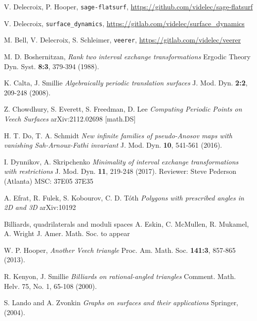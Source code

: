 \documentclass[a4paper,12pt]{article}
\begin{document}
\begin{thebibliography}{sage-flatsurf}

V. Delecroix, P. Hooper,
\texttt{sage-flatsurf},
\url{https://github.com/videlec/sage-flatsurf}

V. Delecroix,
\texttt{surface\_dynamics},
\url{https://gitlab.com/videlec/surface_dynamics}

M. Bell, V. Delecroix, S. Schleimer,
\texttt{veerer},
\url{https://gitlab.com/videlec/veerer}

M. D. Boshernitzan,
\textit{Rank two interval exchange transformations}
Ergodic Theory Dyn. Syst. \textbf{8:3}, 379-394 (1988).

K. Calta, J. Smillie
\textit{Algebraically periodic translation surfaces}
J. Mod. Dyn. \textbf{2:2}, 209-248 (2008).

Z. Chowdhury, S. Everett, S. Freedman, D. Lee
\textit{Computing Periodic Points on Veech Surfaces}
arXiv:2112.02698 [math.DS]

H. T. Do, T. A. Schmidt
\textit{New infinite families of pseudo-Anosov maps with vanishing Sah-Arnoux-Fathi invariant}
J. Mod. Dyn. \textbf{10}, 541-561 (2016).

I. Dynnikov, A. Skripchenko
\textit{Minimality of interval exchange transformations with restrictions}
J. Mod. Dyn. \textbf{11}, 219-248 (2017).
Reviewer: Steve Pederson (Atlanta)
MSC:  37E05 37E35

A. Efrat, R. Fulek, S. Kobourov, C. D. T\'oth
\textit{Polygons with prescribed angles in 2D and 3D}
arXiv:10192

Billiards, quadrilaterals and moduli spaces
A. Eskin, C. McMullen, R. Mukamel, A. Wright
J. Amer. Math. Soc. to appear

W. P. Hooper,
\textit{Another Veech triangle}
Proc. Am. Math. Soc. \textbf{141:3}, 857-865 (2013).

R. Kenyon, J. Smillie
\textit{Billiards on rational-angled triangles}
Comment. Math. Helv. 75, No. 1, 65-108 (2000).

S. Lando and A. Zvonkin
\textit{Graphs on surfaces and their applications}
Springer, (2004).


\end{thebibliography}
\end{document}
